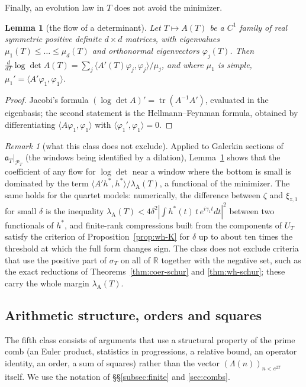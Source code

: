\documentclass[11pt]{amsart}
\newtheorem{lemma}[theorem]{Lemma}
\theoremstyle{definition}
\theoremstyle{remark}
\newtheorem{remark}[theorem]{Remark}
\newcommand{\R}{\mathbb R}
\newcommand{\PT}{\mathcal P_T}
\newcommand{\lamA}{\lambda_{\mathrm A}(T)}
\newcommand{\sT}{\sigma_T}
\begin{document}
Finally, an evolution law in $T$ does not avoid the minimizer.

\begin{lemma}[the flow of a determinant]\label{lem:flowdet}
Let $T\mapsto A(T)$ be a $C^1$ family of real symmetric positive definite $d\times d$ matrices, with eigenvalues
$\mu_1(T)\le\dots\le\mu_d(T)$ and orthonormal eigenvectors $\varphi_j(T)$. Then
$\frac d{dT}\log\det A(T)=\sum_j\langle A'(T)\varphi_j,\varphi_j\rangle/\mu_j$, and where $\mu_1$ is simple,
$\mu_1'=\langle A'\varphi_1,\varphi_1\rangle$.
\end{lemma}
\begin{proof}
Jacobi's formula $(\log\det A)'=\operatorname{tr}(A^{-1}A')$, evaluated in the eigenbasis; the second statement is the
Hellmann--Feynman formula, obtained by differentiating $\langle A\varphi_1,\varphi_1\rangle$ with
$\langle\varphi_1',\varphi_1\rangle=0$.
\end{proof}

\begin{remark}[what this class does not exclude]\label{rem:bar-loc}
Applied to Galerkin sections of $\mathfrak a_T|_{\PT}$ (the windows being identified by a dilation),
Lemma~\ref{lem:flowdet} shows that the coefficient of any flow for $\log\det$ near a window where the bottom is small
is dominated by the term $\langle A'h^*,h^*\rangle/\lamA$, a functional of the minimizer. The same holds for the
quartet models: numerically, the difference between $\zeta$ and $\xi_{z,1}$ for small $\delta$ is the inequality
$\lamA<4\delta^2|\int h^*(t)\,t\,e^{i\gamma_1t}dt|^2$ between two functionals of $h^*$, and finite-rank compressions
built from the components of $U_T$ satisfy the criterion of Proposition~\ref{prop:wh-K} for $\delta$ up to about ten
times the threshold at which the full form changes sign. The class does not exclude criteria that use the positive
part of $\sT$ on all of $\R$ together with the negative set, such as the exact reductions of
Theorems~\ref{thm:coer-schur} and \ref{thm:wh-schur}; these carry the whole margin $\lamA$.
\end{remark}


\subsection{Arithmetic structure, orders and squares}\label{subsec:bar-arith}

The fifth class consists of arguments that use a structural property of the prime comb (an Euler product,
statistics in progressions, a relative bound, an operator identity, an order, a sum of squares) rather than the
vector $(\Lambda(n))_{n<e^{2T}}$ itself. We use the notation of \S\S\ref{subsec:finite} and \ref{sec:combs}.
\end{document}
